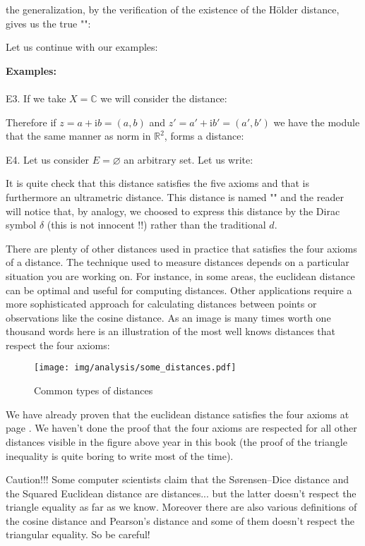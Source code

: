 	the generalization, by the verification of the existence of the Hölder distance, gives us the true "":
	

	Let us continue with our examples:
	\begin{tcolorbox}[colframe=black,colback=white,sharp corners]
	\textbf{{\Large {}}Examples:}\\\\
	E3. If we take $X=\mathbb{C}$ we will consider the distance:
	
	Therefore if $z=a+\mathrm{i}b=(a,b)$ and $z'=a'+\mathrm{i}b'=(a',b')$ we have the module that the same manner as norm in $\mathbb{R}^2$, forms a distance:
	
	
	E4. Let us consider $E=\varnothing$ an arbitrary set. Let us write:
	
	It is quite check that this distance satisfies the five axioms and that is furthermore an ultrametric distance. This distance is named "" and the reader will notice that, by analogy, we choosed to express this distance by the Dirac symbol $\delta$ (this is not innocent !!) rather than the traditional $d$.
	\end{tcolorbox}
	
	There are plenty of other distances used in practice that satisfies the four axioms of a distance. The technique used to measure distances depends on a particular situation you are working on. For instance, in some areas, the euclidean distance can be optimal and useful for computing distances. Other applications require a more sophisticated approach for calculating distances between points or observations like the cosine distance.  As an image is many times worth one thousand words\label{common types of distances} here is an illustration of the most well knows distances that respect the four axioms:
	\begin{figure}[H]
		\centering
		\texttt{[image: img/analysis/some\_distances.pdf]}
		\caption{Common types of distances}
	\end{figure}
	We have already proven that the euclidean distance satisfies the four axioms at page \pageref{euclidean distance vector}. We haven't done the proof that the four axioms are respected for all other distances visible in the figure above year in this book (the proof of the triangle inequality is quite boring to write most of the time). 
	
	\begin{tcolorbox}[enhanced,colback=red!5!white,colframe=black!50!red,boxrule=1pt,arc=0pt,outer arc=0pt,drop lifted shadow,after skip=10pt plus 2pt]
		\bcbombe Caution!!! Some computer scientists claim that the Sørensen–Dice distance and the Squared Euclidean distance are distances... but the latter doesn't respect the triangle equality as far as we know. Moreover there are also various definitions of the cosine distance and Pearson's distance and some of them doesn't respect the triangular equality. So be careful!
		\end{tcolorbox}
	
